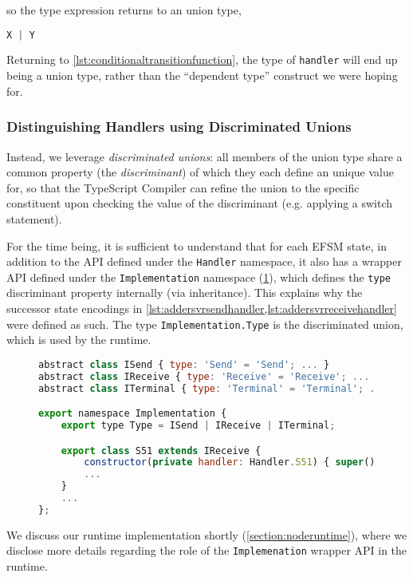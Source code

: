 so the type expression returns to an union type,

\begin{lstlisting}[language=javascript,numbers=none]
X | Y
\end{lstlisting}

Returning to \cref{lst:conditionaltransitionfunction}, 
the type of \texttt{handler} will end up being a union type, 
rather than the ``dependent type''
construct we were hoping for.

\subsubsection{Distinguishing Handlers using Discriminated Unions}

Instead, we leverage \textit{discriminated unions}: all members
of the union type share a common property (the \textit{discriminant})
of which they each define an
unique value for, so that the TypeScript Compiler can refine the union
to the specific constituent upon checking the value of the discriminant
(e.g. applying a switch statement).

For the time being,
it is sufficient to understand that for each EFSM state,
in addition to the API defined under the
\texttt{Handler} namespace, it also has a wrapper API defined under
the \texttt{Implementation} namespace (\cref{lst:nodeefsmimplementation}),
which defines the \texttt{type}
discriminant property internally (via inheritance).
This explains why the successor
state encodings in 
\cref{lst:addersvrsendhandler,lst:addersvrreceivehandler}
were defined as such.
The type \texttt{Implementation.Type} is the discriminated union,
which is used by the runtime.

\begin{figure}[!h]
\begin{lstlisting}[language=javascript,tabsize=2]
abstract class ISend { type: 'Send' = 'Send'; ... }
abstract class IReceive { type: 'Receive' = 'Receive'; ... }
abstract class ITerminal { type: 'Terminal' = 'Terminal'; ... }

export namespace Implementation {
	export type Type = ISend | IReceive | ITerminal;

	export class S51 extends IReceive {
		constructor(private handler: Handler.S51) { super(); }
		...
	}
	...	
};
\end{lstlisting}
\label{lst:nodeefsmimplementation}
\end{figure}

We discuss our runtime implementation shortly 
(\cref{section:noderuntime}), where we disclose more details regarding
the role of the \texttt{Implemenation} wrapper API in
the runtime.